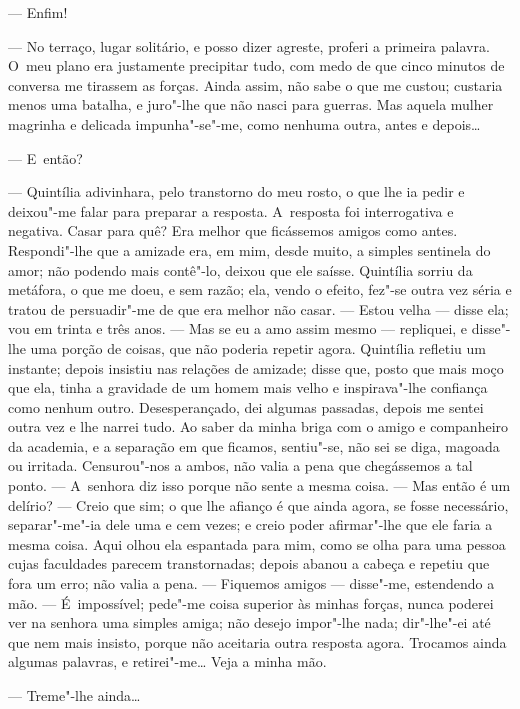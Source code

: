 \begin{linenumbers}
--- Enfim!

--- No terraço, lugar solitário, e posso dizer agreste, proferi a
primeira palavra. O~meu plano era justamente precipitar tudo, com medo
de que cinco minutos de conversa me tirassem as forças. Ainda assim, não
sabe o que me custou; custaria menos uma batalha, e juro"-lhe que não
nasci para guerras. Mas aquela mulher magrinha e delicada impunha"-se"-me,
como nenhuma outra, antes e depois\ldots{}

--- E~então?

--- Quintília adivinhara, pelo transtorno do meu rosto, o que lhe ia
pedir e deixou"-me falar para preparar a resposta. A~resposta foi
interrogativa e negativa. Casar para quê? Era melhor que ficássemos
amigos como antes. Respondi"-lhe que a amizade era, em mim, desde muito,
a simples sentinela do amor; não podendo mais contê"-lo, deixou que ele
saísse. Quintília sorriu da metáfora, o que me doeu, e sem razão; ela,
vendo o efeito, fez"-se outra vez séria e tratou de persuadir"-me de que
era melhor não casar. --- Estou velha --- disse ela; vou em trinta e três
anos. --- Mas se eu a amo assim mesmo --- repliquei, e disse"-lhe uma
porção de coisas, que não poderia repetir agora. Quintília refletiu um
instante; depois insistiu nas relações de amizade; disse que, posto que
mais moço que ela, tinha a gravidade de um homem mais velho e
inspirava"-lhe confiança como nenhum outro. Desesperançado, dei algumas
passadas, depois me sentei outra vez e lhe narrei tudo. Ao saber da
minha briga com o amigo e companheiro da academia, e a separação em que
ficamos, sentiu"-se, não sei se diga, magoada ou irritada. Censurou"-nos a
ambos, não valia a pena que chegássemos a tal ponto. --- A~senhora diz
isso porque não sente a mesma coisa. --- Mas então é um delírio? --- Creio
que sim; o que lhe afianço é que ainda agora, se fosse necessário,
separar"-me"-ia dele uma e cem vezes; e creio poder afirmar"-lhe que ele
faria a mesma coisa. Aqui olhou ela espantada para mim, como se olha
para uma pessoa cujas faculdades parecem transtornadas; depois abanou a
cabeça e repetiu que fora um erro; não valia a pena. --- Fiquemos amigos
--- disse"-me, estendendo a mão. --- É~impossível; pede"-me coisa superior
às minhas forças, nunca poderei ver na senhora uma simples amiga; não
desejo impor"-lhe nada; dir"-lhe"-ei até que nem mais insisto, porque não
aceitaria outra resposta agora. Trocamos ainda algumas palavras, e
retirei"-me\ldots{} Veja a minha mão.

--- Treme"-lhe ainda\ldots{}


\end{linenumbers}
